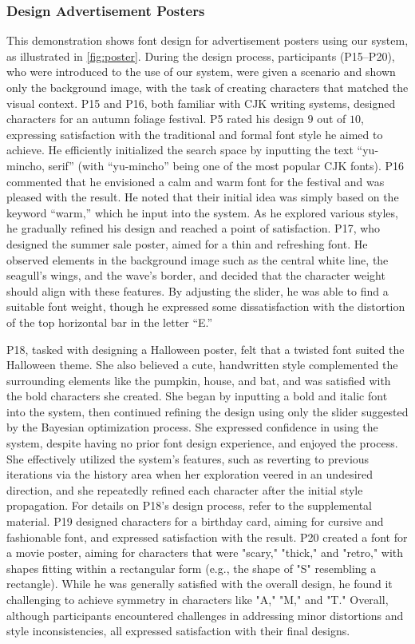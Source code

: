 \subsubsection{Design Advertisement Posters}
This demonstration shows font design for advertisement posters using our system, as illustrated in \autoref{fig:poster}.
During the design process, participants (P15--P20), who were introduced to the use of our system, were given a scenario and shown only the background image, with the task of creating characters that matched the visual context.
P15 and P16, both familiar with CJK writing systems, designed characters for an autumn foliage festival.
P5 rated his design $9$ out of $10$, expressing satisfaction with the traditional and formal font style he aimed to achieve.
He efficiently initialized the search space by inputting the text ``yu-mincho, serif'' (with ``yu-mincho'' being one of the most popular CJK fonts).
P16 commented that he envisioned a calm and warm font for the festival and was pleased with the result. 
He noted that their initial idea was simply based on the keyword ``warm,'' which he input into the system.
As he explored various styles, he gradually refined his design and reached a point of satisfaction.
P17, who designed the summer sale poster, aimed for a thin and refreshing font.
He observed elements in the background image such as the central white line, the seagull's wings, and the wave’s border, and decided that the character weight should align with these features.
By adjusting the slider, he was able to find a suitable font weight, though he expressed some dissatisfaction with the distortion of the top horizontal bar in the letter ``E.''

P18, tasked with designing a Halloween poster, felt that a twisted font suited the Halloween theme. 
She also believed a cute, handwritten style complemented the surrounding elements like the pumpkin, house, and bat, and was satisfied with the bold characters she created. 
She began by inputting a bold and italic font into the system, then continued refining the design using only the slider suggested by the Bayesian optimization process.
She expressed confidence in using the system, despite having no prior font design experience, and enjoyed the process. 
She effectively utilized the system's features, such as reverting to previous iterations via the history area when her exploration veered in an undesired direction, and she repeatedly refined each character after the initial style propagation.
For details on P18's design process, refer to the supplemental material.
P19 designed characters for a birthday card, aiming for cursive and fashionable font, and expressed satisfaction with the result.
P20 created a font for a movie poster, aiming for characters that were "scary," "thick," and "retro," with shapes fitting within a rectangular form (e.g., the shape of "S" resembling a rectangle).
While he was generally satisfied with the overall design, he found it challenging to achieve symmetry in characters like "A," "M," and "T."
Overall, although participants encountered challenges in addressing minor distortions and style inconsistencies, all expressed satisfaction with their final designs.


